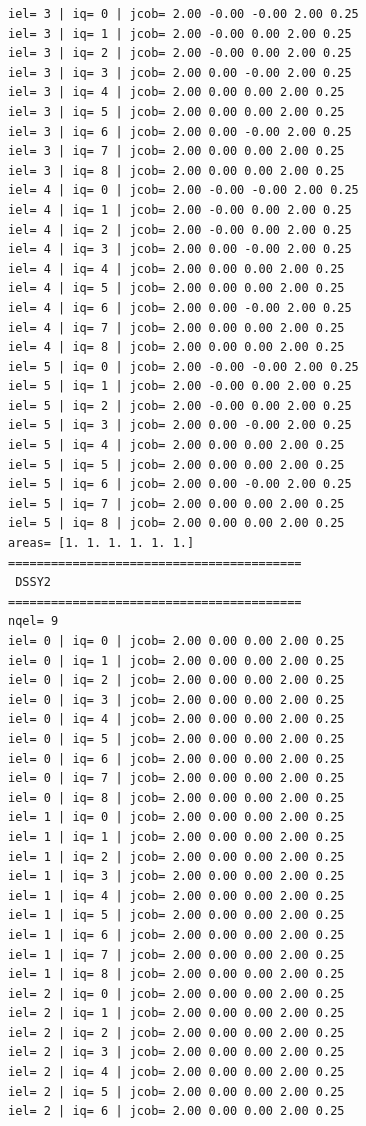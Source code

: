 \begin{tiny}
\begin{verbatim}
iel= 3 | iq= 0 | jcob= 2.00 -0.00 -0.00 2.00 0.25
iel= 3 | iq= 1 | jcob= 2.00 -0.00 0.00 2.00 0.25
iel= 3 | iq= 2 | jcob= 2.00 -0.00 0.00 2.00 0.25
iel= 3 | iq= 3 | jcob= 2.00 0.00 -0.00 2.00 0.25
iel= 3 | iq= 4 | jcob= 2.00 0.00 0.00 2.00 0.25
iel= 3 | iq= 5 | jcob= 2.00 0.00 0.00 2.00 0.25
iel= 3 | iq= 6 | jcob= 2.00 0.00 -0.00 2.00 0.25
iel= 3 | iq= 7 | jcob= 2.00 0.00 0.00 2.00 0.25
iel= 3 | iq= 8 | jcob= 2.00 0.00 0.00 2.00 0.25
iel= 4 | iq= 0 | jcob= 2.00 -0.00 -0.00 2.00 0.25
iel= 4 | iq= 1 | jcob= 2.00 -0.00 0.00 2.00 0.25
iel= 4 | iq= 2 | jcob= 2.00 -0.00 0.00 2.00 0.25
iel= 4 | iq= 3 | jcob= 2.00 0.00 -0.00 2.00 0.25
iel= 4 | iq= 4 | jcob= 2.00 0.00 0.00 2.00 0.25
iel= 4 | iq= 5 | jcob= 2.00 0.00 0.00 2.00 0.25
iel= 4 | iq= 6 | jcob= 2.00 0.00 -0.00 2.00 0.25
iel= 4 | iq= 7 | jcob= 2.00 0.00 0.00 2.00 0.25
iel= 4 | iq= 8 | jcob= 2.00 0.00 0.00 2.00 0.25
iel= 5 | iq= 0 | jcob= 2.00 -0.00 -0.00 2.00 0.25
iel= 5 | iq= 1 | jcob= 2.00 -0.00 0.00 2.00 0.25
iel= 5 | iq= 2 | jcob= 2.00 -0.00 0.00 2.00 0.25
iel= 5 | iq= 3 | jcob= 2.00 0.00 -0.00 2.00 0.25
iel= 5 | iq= 4 | jcob= 2.00 0.00 0.00 2.00 0.25
iel= 5 | iq= 5 | jcob= 2.00 0.00 0.00 2.00 0.25
iel= 5 | iq= 6 | jcob= 2.00 0.00 -0.00 2.00 0.25
iel= 5 | iq= 7 | jcob= 2.00 0.00 0.00 2.00 0.25
iel= 5 | iq= 8 | jcob= 2.00 0.00 0.00 2.00 0.25
areas= [1. 1. 1. 1. 1. 1.]
=========================================
 DSSY2
=========================================
nqel= 9
iel= 0 | iq= 0 | jcob= 2.00 0.00 0.00 2.00 0.25
iel= 0 | iq= 1 | jcob= 2.00 0.00 0.00 2.00 0.25
iel= 0 | iq= 2 | jcob= 2.00 0.00 0.00 2.00 0.25
iel= 0 | iq= 3 | jcob= 2.00 0.00 0.00 2.00 0.25
iel= 0 | iq= 4 | jcob= 2.00 0.00 0.00 2.00 0.25
iel= 0 | iq= 5 | jcob= 2.00 0.00 0.00 2.00 0.25
iel= 0 | iq= 6 | jcob= 2.00 0.00 0.00 2.00 0.25
iel= 0 | iq= 7 | jcob= 2.00 0.00 0.00 2.00 0.25
iel= 0 | iq= 8 | jcob= 2.00 0.00 0.00 2.00 0.25
iel= 1 | iq= 0 | jcob= 2.00 0.00 0.00 2.00 0.25
iel= 1 | iq= 1 | jcob= 2.00 0.00 0.00 2.00 0.25
iel= 1 | iq= 2 | jcob= 2.00 0.00 0.00 2.00 0.25
iel= 1 | iq= 3 | jcob= 2.00 0.00 0.00 2.00 0.25
iel= 1 | iq= 4 | jcob= 2.00 0.00 0.00 2.00 0.25
iel= 1 | iq= 5 | jcob= 2.00 0.00 0.00 2.00 0.25
iel= 1 | iq= 6 | jcob= 2.00 0.00 0.00 2.00 0.25
iel= 1 | iq= 7 | jcob= 2.00 0.00 0.00 2.00 0.25
iel= 1 | iq= 8 | jcob= 2.00 0.00 0.00 2.00 0.25
iel= 2 | iq= 0 | jcob= 2.00 0.00 0.00 2.00 0.25
iel= 2 | iq= 1 | jcob= 2.00 0.00 0.00 2.00 0.25
iel= 2 | iq= 2 | jcob= 2.00 0.00 0.00 2.00 0.25
iel= 2 | iq= 3 | jcob= 2.00 0.00 0.00 2.00 0.25
iel= 2 | iq= 4 | jcob= 2.00 0.00 0.00 2.00 0.25
iel= 2 | iq= 5 | jcob= 2.00 0.00 0.00 2.00 0.25
iel= 2 | iq= 6 | jcob= 2.00 0.00 0.00 2.00 0.25

\end{verbatim}
\end{tiny}
